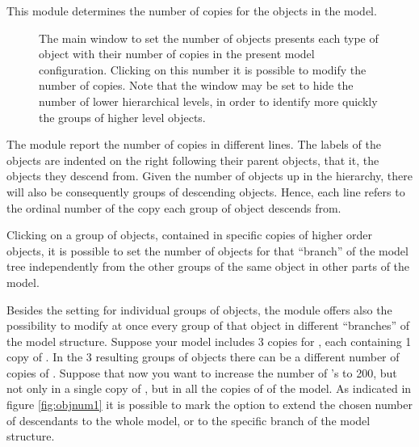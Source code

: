 \documentclass [11pt,a4paper] {book}
\begin{document}
This module determines the number of copies for the objects in the model.

\begin{figure}[ht]
  \centering
  \caption{\small The main window to set the number of objects presents each type of object with their number of copies in the present model configuration. Clicking on this number it is possible to modify the number of copies. Note that the window may be set to hide the number of lower hierarchical levels, in order to identify more quickly the groups of higher level objects.}
  \label{fig:objnum}
\end{figure}

The module report the number of copies  in different lines. The labels of the objects are indented on the right following their parent objects, that it, the objects they descend from. Given the number of objects up in the hierarchy, there will also be consequently groups of descending objects. Hence, each line refers to the ordinal number of  the copy each group of object descends from. 


Clicking on a group of objects, contained in specific copies of higher order objects, it is possible to set the number of objects for that ``branch'' of the model tree independently from the other groups of the same object in other parts of the model.


Besides the setting for individual groups of objects, the module offers also the possibility to modify at once every group of that object in different ``branches'' of the model structure. Suppose your model includes 3 copies for , each containing 1 copy of . In the 3 resulting groups of objects there can be a different number of copies of . Suppose that now you want to increase the number of 's to 200, but not only in a single copy of , but in all the copies of  of the model. As indicated in figure \ref{fig:objnum1} it is possible to mark the option to extend the chosen number of descendants to the whole model, or to the specific branch of the model structure.
\end{document}
